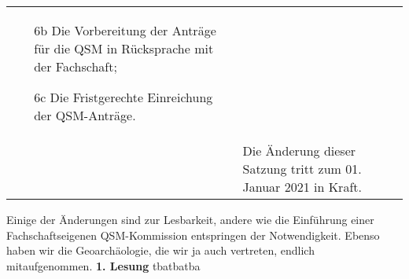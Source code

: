 {\begin{longtable}{|p{7.5cm}|p{7.5cm}|}
\begin{itemize}
        \item[6b]Die Vorbereitung der Anträge für die QSM in Rücksprache mit der Fachschaft;
        \item[6c]   Die Fristgerechte Einreichung der QSM-Anträge.
        \end{itemize}\\
        & Die Änderung dieser Satzung tritt zum 01. Januar 2021 in Kraft.\\
    \end{longtable}
}{
    Einige der Änderungen sind zur Lesbarkeit, andere wie die Einführung einer Fachschaftseigenen QSM-Kommission entspringen der Notwendigkeit. Ebenso haben wir die Geoarchäologie, die wir ja auch vertreten, endlich mitaufgenommen.
}{
    \textbf{1. Lesung}
}{tba}{tba}{tba}

